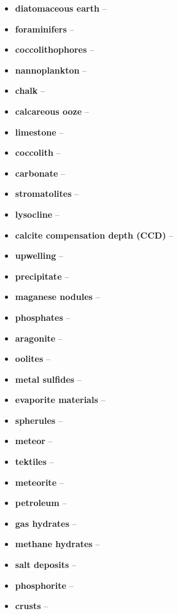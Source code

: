 \begin{itemize}
	\item \textbf{diatomaceous earth} -- 
	\item \textbf{foraminifers} -- 
	\item \textbf{coccolithophores} -- 
	\item \textbf{nannoplankton} -- 
	\item \textbf{chalk} -- 
	\item \textbf{calcareous ooze} -- 
	\item \textbf{limestone} -- 
	\item \textbf{coccolith} -- 
	\item \textbf{carbonate} -- 
	\item \textbf{stromatolites} -- 
	\item \textbf{lysocline} -- 
	\item \textbf{calcite compensation depth (CCD)} -- 
	\item \textbf{upwelling} -- 
	\item \textbf{precipitate} -- 
	\item \textbf{maganese nodules} -- 
	\item \textbf{phosphates} -- 
	\item \textbf{aragonite} -- 
	\item \textbf{oolites} -- 
	\item \textbf{metal sulfides} -- 
	\item \textbf{evaporite materials} -- 
	\item \textbf{spherules} -- 
	\item \textbf{meteor} -- 
	\item \textbf{tektiles} -- 
	\item \textbf{meteorite} -- 
	\item \textbf{petroleum} -- 
	\item \textbf{gas hydrates} -- 
	\item \textbf{methane hydrates} -- 
	\item \textbf{salt deposits} -- 
	\item \textbf{phosphorite} -- 
	\item \textbf{crusts} -- 
\end{itemize}

